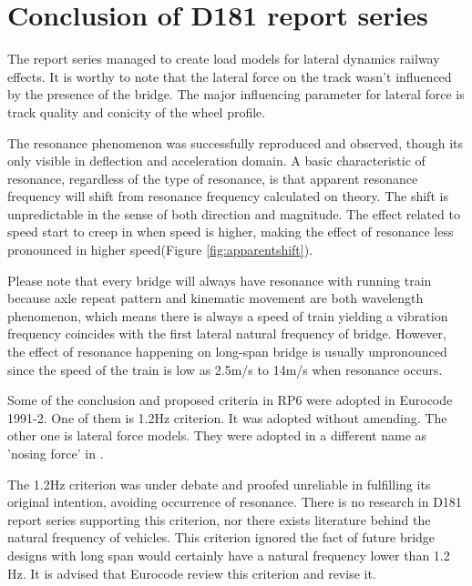 \section{Conclusion of D181 report series}
The report series managed to create load models for lateral dynamics railway effects. It is worthy to note that the lateral force on the track wasn't influenced by the presence of the bridge. The major influencing parameter for lateral force is track quality and conicity of the wheel profile. 

The resonance phenomenon was successfully reproduced and observed, though its only visible in deflection and acceleration domain. A basic characteristic of resonance, regardless of the type of resonance, is that apparent resonance frequency will shift from resonance frequency calculated on theory. The shift is unpredictable in the sense of both direction and magnitude. The effect related to speed start to creep in when speed is higher, making the effect of resonance less pronounced in higher speed(Figure \ref{fig:apparentshift}). 

Please note that every bridge will always have resonance with running train because axle repeat pattern and kinematic movement are both wavelength phenomenon, which means there is always a speed of train yielding a vibration frequency coincides with the first lateral natural frequency of bridge. However, the effect of resonance happening on long-span bridge is usually unpronounced since the speed of the train is low as 2.5m/s to 14m/s when resonance occurs.  

Some of the conclusion and proposed criteria in RP6 were adopted in Eurocode 1991-2. One of them is 1.2Hz criterion. It was adopted without amending. The other one is lateral force models. They were adopted in a different name as 'nosing force' in \cite[A6.5.2]{EC12}. 

The 1.2Hz criterion was under debate and proofed unreliable in fulfilling its original intention, avoiding occurrence of resonance. There is no research in D181 report series supporting this criterion, nor there exists literature behind the natural frequency of vehicles. This criterion ignored the fact of future bridge designs with long span would certainly have a natural frequency lower than 1.2 Hz. It is advised that Eurocode review this criterion and revise it.
